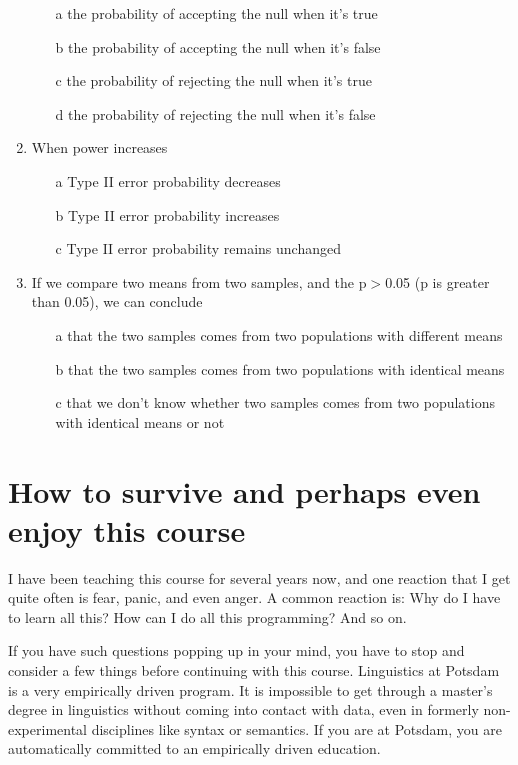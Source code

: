 \documentclass[12pt]{book}\usepackage[]{graphicx}\usepackage[]{color}
\begin{document}
\begin{enumerate}
\begin{enumerate}
\item[a]
the probability of accepting the null when it's true
\item[b]
the probability of accepting the null when it's false
\item[c]
the probability of rejecting the null when it's true
\item[d]
the probability of rejecting the null when it's false
\end{enumerate}

\item
When power increases
\begin{enumerate}
\item[a]
Type II error probability decreases
\item[b]
Type II error probability increases
\item[c]
Type II error probability remains unchanged
\end{enumerate}

\item
If we compare two means from two samples, and the p$>$0.05 (p is greater than 0.05), we can conclude 

\begin{enumerate}
\item[a]
that the two samples comes from two populations with different means
\item[b]
 that the two samples comes from two populations with identical means
\item[c]
that we don't know whether two samples comes from two populations with identical means or not
\end{enumerate}
\end{enumerate}

\section{How to survive and perhaps even enjoy this course}

I have been teaching this course for several years now, and one reaction that I get quite often is fear, panic, and even anger.
A common reaction is: Why do I have to learn all this? How can I do all this programming? And so on. 

If you have such questions popping up in your mind, you have to stop and consider a few things before continuing with this course.  
Linguistics at Potsdam is a very empirically driven program. It is impossible to get through a master's degree in linguistics without coming into contact with data, even in formerly non-experimental disciplines like syntax or semantics. If you are at Potsdam, you are automatically committed to an empirically driven education. 
\end{document}
